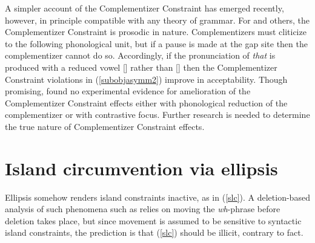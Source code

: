 \documentclass[output=paper
 	        ,biblatex
                ,babelshorthands
                ,newtxmath
                ,draftmode
                ,colorlinks, citecolor=brown
]{langscibook}
\begin{document}
A simpler account of the  Complementizer Constraint has emerged recently, however, in principle compatible with any theory of grammar. For \citet{Kandy06,Kandy09} and others,  the Complementizer Constraint is prosodic in nature.  Complementizers must cliticize to the following phonological unit, but if a pause is made at the gap site then the complementizer cannot do so.  Accordingly, if the pronunciation of \emph{that} is
produced with a reduced vowel [] rather than [] then the
Complementizer Constraint violations in (\ref{subobjasymm2}) improve in acceptability. Though promising,
\citet{Richart} found no experimental evidence for amelioration of the Complementizer Constraint effects
either with phonological reduction of the complementizer or with contrastive focus. Further research is needed
to determine the true nature of  Complementizer Constraint effects.



\section{Island circumvention via ellipsis}

Ellipsis somehow renders island  constraints inactive, as in (\ref{slc}). A deletion-based analysis of such phenomena such as  \citet{merchantbook}  relies on moving the \emph{wh}-phrase before deletion takes place, but since  movement is assumed to be sensitive to syntactic island constraints, the  prediction is that (\ref{slc}) should be illicit, contrary to fact. 

\eal  \label{slc}



\zl
\end{document}
